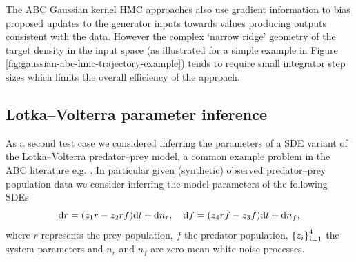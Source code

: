 The \ac{ABC} Gaussian kernel \ac{HMC} approaches also use gradient information to bias proposed updates to the generator inputs towards values producing outputs consistent with the data. However the complex `narrow ridge' geometry of the target density in the input space (as illustrated for a simple example in Figure \ref{fig:gaussian-abc-hmc-trajectory-example}) tends to require small integrator step sizes which limits the overall efficiency of the approach.

\subsection{Lotka--Volterra parameter inference}

As a second test case we considered inferring the parameters of a \ac{SDE} variant of the Lotka--Volterra predator--prey model, a common example problem in the \ac{ABC} literature e.g. \citep{meeds2015optimization,papamakarios2016epsilon}. In particular given (synthetic) observed predator--prey population data we consider inferring the model parameters of the following \acp{SDE}
\begin{equation}\label{eq:lotka-volterra}
    \dr r = \lpa z_1 r - z_2 r f \rpa \dr t + \dr n_r,
    \quad
    \dr f = \lpa z_4 r f -z_3 f \rpa \dr t + \dr n_f,
\end{equation}
where $r$ represents the prey population, $f$ the predator population, $\fset{z_i}_{i=1}^4$ the system parameters and $n_r$ and $n_f$ are zero-mean white noise processes.

